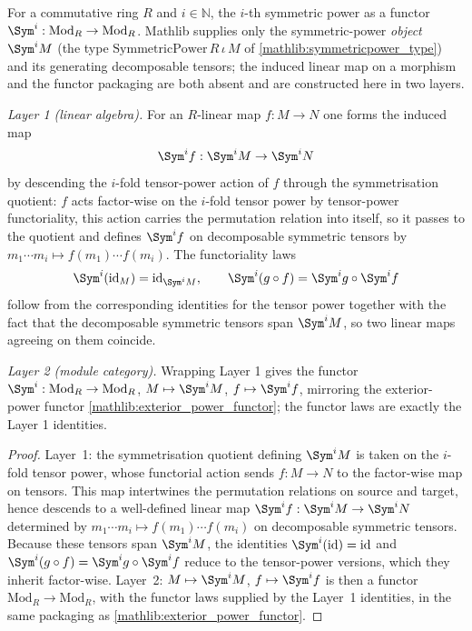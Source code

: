 \begin{lemma}
  \label{found:modulecat_sym_power}
  For a commutative ring \(R\) and \(i\in\mathbb N\), the \(i\)-th symmetric power
  as a functor \(\Sym^i:\mathrm{Mod}_R\to\mathrm{Mod}_R\).  Mathlib supplies only
  the symmetric-power \emph{object} \(\Sym^i M\) (the type
  \(\mathrm{SymmetricPower}\,R\,\iota\,M\) of \cref{mathlib:symmetricpower_type})
  and its generating decomposable tensors; the induced linear map on a morphism
  and the functor packaging are both absent and are constructed here in two
  layers.

  \emph{Layer 1 (linear algebra).}  For an \(R\)-linear map \(f:M\to N\) one
  forms the induced map
  \[
    \Sym^i f:\Sym^i M\to\Sym^i N
  \]
  by descending the \(i\)-fold tensor-power action of \(f\) through the
  symmetrisation quotient: \(f\) acts factor-wise on the \(i\)-fold tensor power
  by tensor-power functoriality, this action carries the permutation relation
  into itself, so it passes to the quotient and defines \(\Sym^i f\) on
  decomposable symmetric tensors by \(m_1\cdots m_i\mapsto f(m_1)\cdots f(m_i)\).
  The functoriality laws
  \[
    \Sym^i(\mathrm{id}_M)=\mathrm{id}_{\Sym^i M},\qquad
    \Sym^i(g\circ f)=\Sym^i g\circ\Sym^i f
  \]
  follow from the corresponding identities for the tensor power together with the
  fact that the decomposable symmetric tensors span \(\Sym^i M\), so two linear
  maps agreeing on them coincide.

  \emph{Layer 2 (module category).}  Wrapping Layer 1 gives the functor
  \(\Sym^i:\mathrm{Mod}_R\to\mathrm{Mod}_R\), \(M\mapsto\Sym^i M\),
  \(f\mapsto\Sym^i f\), mirroring the exterior-power functor
  \cref{mathlib:exterior_power_functor}; the functor laws are exactly the
  Layer 1 identities.
\end{lemma}

\begin{proof}
  \leanok
  Layer~1: the symmetrisation quotient defining \(\Sym^i M\) is taken on the
  \(i\)-fold tensor power, whose functorial action sends \(f:M\to N\) to the
  factor-wise map on tensors.  This map intertwines the permutation relations on
  source and target, hence descends to a well-defined linear map
  \(\Sym^i f:\Sym^i M\to\Sym^i N\) determined by
  \(m_1\cdots m_i\mapsto f(m_1)\cdots f(m_i)\) on decomposable symmetric tensors.
  Because these tensors span \(\Sym^i M\), the identities
  \(\Sym^i(\mathrm{id})=\mathrm{id}\) and
  \(\Sym^i(g\circ f)=\Sym^i g\circ\Sym^i f\) reduce to the tensor-power versions,
  which they inherit factor-wise.  Layer~2: \(M\mapsto\Sym^i M\),
  \(f\mapsto\Sym^i f\) is then a functor \(\mathrm{Mod}_R\to\mathrm{Mod}_R\), with
  the functor laws supplied by the Layer~1 identities, in the same packaging as
  \cref{mathlib:exterior_power_functor}.
\end{proof}

